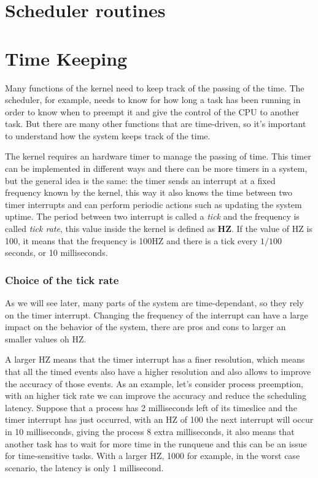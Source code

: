 \documentclass[10pt, oneside]{book}
\begin{document}
\section{Scheduler routines} 

\section{Time Keeping}%
\label{sec:timekeeping}
Many functions of the kernel need to keep track of the passing of the time. The scheduler, for example, needs to know for how long a task has been running in order to know when to preempt it and give the control of the CPU to another task. But there are many other functions that are time-driven, so it's important to understand how the system keeps track of the time.

The kernel requires an hardware timer to manage the passing of time. This timer can be implemented in different ways and there can be more timers in a system, but the general idea is the same: the timer sends an interrupt at a fixed frequency known by the kernel, this way it also knows the time between two timer interrupts and can perform periodic actions such as updating the system uptime. The period between two interrupt is called a \textit{tick} and the frequency is called \textit{tick rate}, this value inside the kernel is defined as \textbf{HZ}. If the value of HZ is 100, it means that the frequency is 100HZ and there is a tick every $1/100$ seconds, or 10 milliseconds.

\subsubsection{Choice of the tick rate}
As we will see later, many parts of the system are time-dependant, so they rely on the timer interrupt. Changing the frequency of the interrupt can have a large impact on the behavior of the system, there are pros and cons to larger an smaller values oh HZ.

A larger HZ means that the timer interrupt has a finer resolution, which means that all the timed events also have a higher resolution and also allows to improve the accuracy of those events. As an example, let's consider process preemption, with an higher tick rate we can improve the accuracy and reduce the scheduling latency. Suppose that a process has 2 milliseconds left of its timeslice and the timer interrupt has just occurred, with an HZ of 100 the next interrupt will occur in 10 milliseconds, giving the process 8 extra milliseconds, it also means that another task has to wait for more time in the runqueue and this can be an issue for time-sensitive tasks. With a larger HZ, 1000 for example, in the worst case scenario, the latency is only 1 millisecond.
\end{document}
